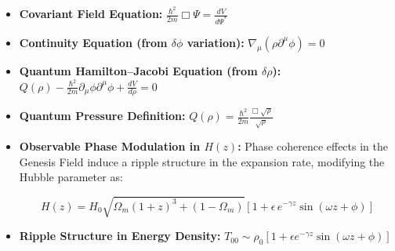 \begin{tcolorbox}[colback=blue!5!white, colframe=blue!75!black, title=\textbf{Summary of Key Derived Relations}, sharp corners=south]
\begin{itemize}
    \item \textbf{Covariant Field Equation:}  
    \quad $\displaystyle \frac{\hbar^2}{2m} \Box \Psi = \frac{dV}{d\Psi^*}$
    
    \item \textbf{Continuity Equation (from $\delta\phi$ variation):}  
    \quad $\displaystyle \nabla_\mu(\rho \partial^\mu \phi) = 0$

    \item \textbf{Quantum Hamilton–Jacobi Equation (from $\delta\rho$):}  
    \quad $\displaystyle Q(\rho) - \frac{\hbar^2}{2m} \partial_\mu \phi \partial^\mu \phi + \frac{dV}{d\rho} = 0$
    
    \item \textbf{Quantum Pressure Definition:}  
    \quad $\displaystyle Q(\rho) = \frac{\hbar^2}{2m} \frac{\Box \sqrt{\rho}}{\sqrt{\rho}}$

\item \textbf{Observable Phase Modulation in $H(z)$:}  
Phase coherence effects in the Genesis Field induce a ripple structure in the expansion rate, modifying the Hubble parameter as:

\begin{equation}
H(z) = H_0 \sqrt{ \Omega_m (1+z)^3 + (1 - \Omega_m) }
\left[ 1 + \epsilon\, e^{-\gamma z} \sin(\omega z + \phi) \right]
\end{equation}

    
    \item \textbf{Ripple Structure in Energy Density:}  
    \quad $\displaystyle T_{00} \sim \rho_0 \left[ 1 + \epsilon e^{-\gamma z} \sin(\omega z + \phi) \right]$
\end{itemize}
\end{tcolorbox}

